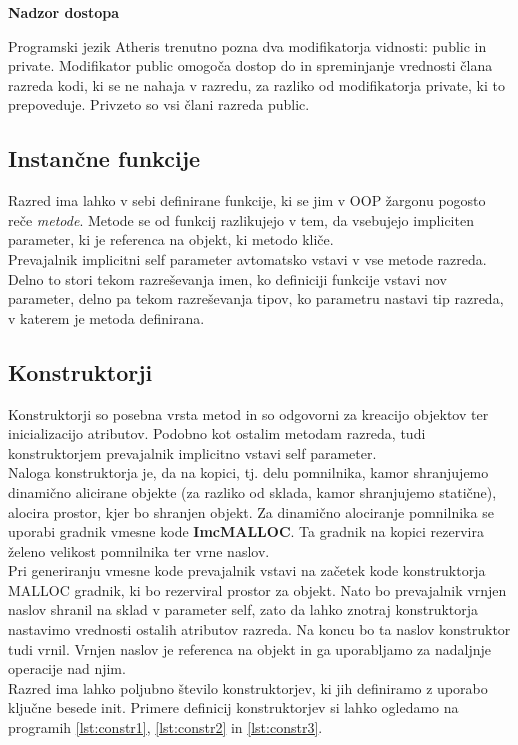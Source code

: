 \documentclass[a4paper, 12p]{book}
\begin{document}
\noindent \textbf{Nadzor dostopa}

\noindent Programski jezik Atheris trenutno pozna dva modifikatorja vidnosti: {\ttfamily public} in {\ttfamily private}. Modifikator public omogoča dostop do in spreminjanje vrednosti člana razreda kodi, ki se ne nahaja v razredu, za razliko od modifikatorja {\ttfamily private}, ki to prepoveduje. Privzeto so vsi člani razreda {\ttfamily public}. 
\subsection{Instančne funkcije}

Razred ima lahko v sebi definirane funkcije, ki se jim v OOP žargonu pogosto reče \textit{metode}. Metode se od funkcij razlikujejo v tem, da vsebujejo impliciten parameter, ki je referenca na objekt, ki metodo kliče.  \\
\indent Prevajalnik implicitni {\ttfamily self} parameter avtomatsko vstavi v vse metode razreda. Delno to stori tekom razreševanja imen, ko definiciji funkcije vstavi nov parameter, delno pa tekom razreševanja tipov, ko parametru nastavi tip razreda, v katerem je metoda definirana.

\subsection{Konstruktorji}

Konstruktorji so posebna vrsta metod in so odgovorni za kreacijo objektov ter inicializacijo atributov. Podobno kot ostalim metodam razreda, tudi konstruktorjem prevajalnik implicitno vstavi {\ttfamily self} parameter. \\
\indent Naloga konstruktorja je, da na kopici, tj. delu pomnilnika, kamor shranjujemo dinamično alicirane objekte (za razliko od sklada, kamor shranjujemo statične), alocira prostor, kjer bo shranjen objekt. Za dinamično alociranje pomnilnika se uporabi gradnik vmesne kode \textbf{ImcMALLOC}. Ta gradnik na kopici rezervira želeno velikost pomnilnika ter vrne naslov. \\ 
\indent Pri generiranju vmesne kode prevajalnik vstavi na začetek kode konstruktorja MALLOC gradnik, ki bo rezerviral prostor za objekt. Nato bo prevajalnik vrnjen naslov shranil na sklad v parameter {\ttfamily self}, zato da lahko znotraj konstruktorja nastavimo vrednosti ostalih atributov razreda. Na koncu bo ta naslov konstruktor tudi vrnil. Vrnjen naslov je referenca na objekt in ga uporabljamo za nadaljnje operacije nad njim. \\
\indent Razred ima lahko poljubno število konstruktorjev, ki jih definiramo z uporabo ključne besede {\ttfamily init}. Primere definicij konstruktorjev si lahko ogledamo na programih \ref{lst:constr1}, \ref{lst:constr2} in \ref{lst:constr3}. \\
\end{document}

